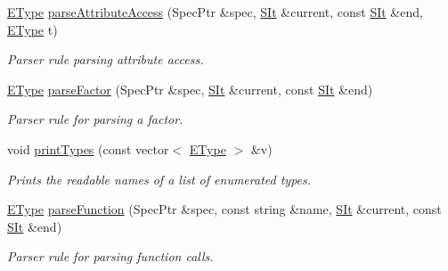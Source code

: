 \begin{DoxyCompactItemize}
\hyperlink{classgiskard__suturo_1_1GiskardLangParser_adbdbadf4ee4e2afb358b4ff98bf7daa2}{E\-Type} \hyperlink{classgiskard__suturo_1_1GiskardLangParser_a26e7d98e8d147a85f405ff6157278042}{parse\-Attribute\-Access} (Spec\-Ptr \&spec, \hyperlink{classgiskard__suturo_1_1GiskardLangParser_aaebad1dc1afc92c7bdc1aa7e4d679621}{S\-It} \&current, const \hyperlink{classgiskard__suturo_1_1GiskardLangParser_aaebad1dc1afc92c7bdc1aa7e4d679621}{S\-It} \&end, \hyperlink{classgiskard__suturo_1_1GiskardLangParser_adbdbadf4ee4e2afb358b4ff98bf7daa2}{E\-Type} t)
\begin{DoxyCompactList}\small\item\em Parser rule parsing attribute access. \end{DoxyCompactList}\item 
\hyperlink{classgiskard__suturo_1_1GiskardLangParser_adbdbadf4ee4e2afb358b4ff98bf7daa2}{E\-Type} \hyperlink{classgiskard__suturo_1_1GiskardLangParser_a0b447a9e9728f0da3fddc149cceeded3}{parse\-Factor} (Spec\-Ptr \&spec, \hyperlink{classgiskard__suturo_1_1GiskardLangParser_aaebad1dc1afc92c7bdc1aa7e4d679621}{S\-It} \&current, const \hyperlink{classgiskard__suturo_1_1GiskardLangParser_aaebad1dc1afc92c7bdc1aa7e4d679621}{S\-It} \&end)
\begin{DoxyCompactList}\small\item\em Parser rule for parsing a factor. \end{DoxyCompactList}\item 
void \hyperlink{classgiskard__suturo_1_1GiskardLangParser_a90183b9608fc8df4da7cc21b020e11ad}{print\-Types} (const vector$<$ \hyperlink{classgiskard__suturo_1_1GiskardLangParser_adbdbadf4ee4e2afb358b4ff98bf7daa2}{E\-Type} $>$ \&v)
\begin{DoxyCompactList}\small\item\em Prints the readable names of a list of enumerated types. \end{DoxyCompactList}\item 
\hyperlink{classgiskard__suturo_1_1GiskardLangParser_adbdbadf4ee4e2afb358b4ff98bf7daa2}{E\-Type} \hyperlink{classgiskard__suturo_1_1GiskardLangParser_ab8d41e91a664b7501eabe649516a8750}{parse\-Function} (Spec\-Ptr \&spec, const string \&name, \hyperlink{classgiskard__suturo_1_1GiskardLangParser_aaebad1dc1afc92c7bdc1aa7e4d679621}{S\-It} \&current, const \hyperlink{classgiskard__suturo_1_1GiskardLangParser_aaebad1dc1afc92c7bdc1aa7e4d679621}{S\-It} \&end)
\begin{DoxyCompactList}\small\item\em Parser rule for parsing function calls. \end{DoxyCompactList}\item 

\end{DoxyCompactItemize}
